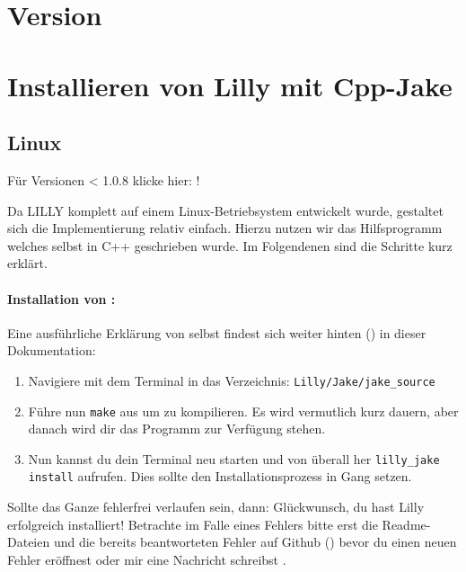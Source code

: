 \section{Version \small{}}
\section{Installieren von Lilly mit Cpp-Jake}
\subsection{Linux}
\begin{center}
    Für Versionen < 1.0.8 klicke hier: !
\end{center}
Da LILLY komplett auf einem Linux-Betriebsystem entwickelt wurde, gestaltet sich die Implementierung relativ einfach.
Hierzu nutzen wir das Hilfsprogramm \Jake welches selbst in C++ geschrieben wurde.
Im Folgendenen sind die Schritte kurz erklärt.
\paragraph{Installation von \Jake:}Eine ausführliche Erklärung von \Jake selbst findest sich weiter hinten () in dieser Dokumentation:\smallskip
{}
\begin{enumerate}\setlength{\itemsep}{0.25\baselineskip}
    \item Navigiere mit dem Terminal in das Verzeichnis: \verb|Lilly/Jake/jake_source|
    \item Führe nun \verb|make| aus um \Jake zu kompilieren.
          Es wird vermutlich kurz dauern, aber danach wird dir das Programm \LJake zur Verfügung stehen.
    \item Nun kannst du dein Terminal neu starten und von überall her \verb|lilly_jake install| aufrufen.
          Dies sollte den Installationsprozess in Gang setzen.\smallskip
\end{enumerate}
Sollte das Ganze fehlerfrei verlaufen sein, dann: Glückwunsch, du hast Lilly erfolgreich installiert!
Betrachte im Falle eines Fehlers bitte erst die Readme-Dateien und die bereits beantworteten Fehler
auf Github (\href{https://github.com/EagleoutIce/LILLY/issues}{\faGithub}) bevor du einen neuen Fehler
eröffnest oder mir eine Nachricht schreibst \Smiley.

